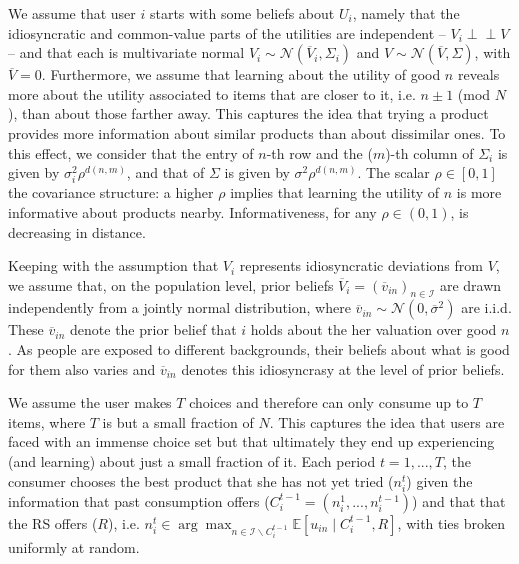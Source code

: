 \documentclass[sigconf]{acmart}
\begin{document}
\par
We assume that user $i$ starts with some beliefs about $U_i$, namely that the idiosyncratic and common-value parts of the utilities are independent -- $V_i \perp \!\!\! \perp V$ -- and that each is multivariate normal $V_i \sim \mathcal N (\overline V_i, \Sigma_i)$ and $V \sim \mathcal N(\overline V, \Sigma)$, with $\overline V =0$.
Furthermore, we assume that learning about the utility of good $n$ reveals more about the utility associated to items that are closer to it, i.e. $n\pm1$ (mod $N$), than about those farther away. This captures the idea that trying a product provides more information about similar products than about dissimilar ones.
To this effect, we consider that the entry of $n$-th row and the ($m$)-th column of $\Sigma_i$ is given by $\sigma_i^2 \rho^{d(n,m)}$, and that of $\Sigma$ is given by $\sigma^2 \rho^{d(n,m)}$. The scalar $\rho \in [0,1]$ the covariance structure: a higher $\rho$ implies that learning the utility of $n$ is more informative about products nearby. Informativeness, for any $\rho \in (0,1)$, is decreasing in distance.
\par
Keeping with the assumption that $V_i$ represents idiosyncratic deviations from $V$, we assume that, on the population level, prior beliefs $\overline V_i=\left(\overline v_{in}\right)_{n \in \mathcal{I}}$ are drawn independently from a jointly normal distribution, where $\overline v_{in} \sim \mathcal N (0, \overline \sigma^2)$ are i.i.d. These $\overline v_{in}$ denote the prior belief that $i$ holds about the her valuation over good $n$. As people are exposed to different backgrounds, their beliefs about what is good for them also varies and $\overline v_{in}$ denotes this idiosyncrasy at the level of prior beliefs. 
\par
We assume the user makes $T$ choices and therefore can only consume up to $T$ items, where $T$ is but a small fraction of $N$. This captures the idea that users are faced with an immense choice set but that ultimately they end up experiencing (and learning) about just a small fraction of it. Each period $t=1,...,T$, the consumer chooses the best product that she has not yet tried ($n_i^t$) given the information that past consumption offers ($C_i^{t-1}=(n_i^1,...,n_i^{t-1})$) and that that the RS offers ($R$), i.e. $n_i^t \in \arg \max_{ n \in \mathcal{I} \backslash C_i^{t-1}} \mathbb E \left[u_{in} \mid C_i^{t-1}, R\right]$, with ties broken uniformly at random. 
\par
\end{document}
